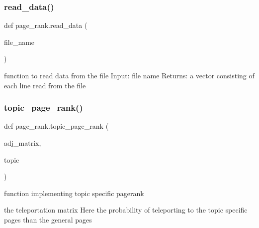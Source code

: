 \subsubsection{\texorpdfstring{read\+\_\+data()}{read\_data()}}
{\footnotesize\ttfamily def page\+\_\+rank.\+read\+\_\+data (\begin{DoxyParamCaption}\item[{}]{file\+\_\+name }\end{DoxyParamCaption})}

\begin{DoxyVerb}function to read data from the file
    Input: file name
    Returns: a vector consisting of each line read from the file  
\end{DoxyVerb}
 \mbox{\label{namespacepage__rank_a475dd0c1857921c7fc45a6bc94958a6a}} 
\subsubsection{\texorpdfstring{topic\+\_\+page\+\_\+rank()}{topic\_page\_rank()}}
{\footnotesize\ttfamily def page\+\_\+rank.\+topic\+\_\+page\+\_\+rank (\begin{DoxyParamCaption}\item[{}]{adj\+\_\+matrix,  }\item[{}]{topic }\end{DoxyParamCaption})}

\begin{DoxyVerb}function implementing topic specific pagerank\end{DoxyVerb}
\begin{DoxyVerb}the teleportation matrix
    Here the probability of teleporting to the topic specific pages 
    than the general pages 
\end{DoxyVerb}
 